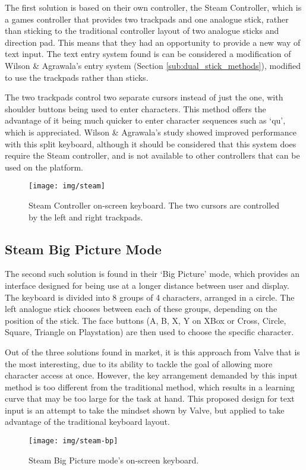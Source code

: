 \documentclass[requirements.tex]{subfiles}
\begin{document}
The first solution is based on their own controller, the Steam Controller, which
is a games controller that provides two trackpads and one analogue stick, rather
than sticking to the traditional controller layout of two analogue sticks and
direction pad. This means that they had an opportunity to provide a new way of
text input. The text entry system found is can be considered a modification of
Wilson \& Agrawala's entry system (Section \ref{sub:dual_stick_methods}),
modified to use the trackpads rather than sticks.

The two trackpads control two separate cursors instead of just the one, with
shoulder buttons being used to enter characters. This method offers the
advantage of it being much quicker to enter character sequences such as `qu',
which is appreciated. Wilson \& Agrawala's study showed improved performance
with this split keyboard, although it should be considered that this system does
require the Steam controller, and is not available to other controllers that can
be used on the platform.

\begin{figure}[H]
	\centering
	\texttt{[image: img/steam]}
	\caption{Steam Controller on-screen keyboard. The two cursors are
	controlled by the left and right trackpads.}
\end{figure}

\subsection{Steam Big Picture Mode} %
\label{sub:steam_big_picture_mode}
The second such solution is found in their `Big Picture' mode, which provides an
interface designed for being use at a longer distance between user and display.
The keyboard is divided into 8 groups of 4 characters, arranged in a circle.
The left analogue stick chooses between each of these groups, depending on the
position of the stick. The face buttons (A, B, X, Y on XBox or Cross, Circle,
Square, Triangle on Playstation) are then used to choose the specific character.

Out of the three solutions found in market, it is this approach from Valve that
is the most interesting, due to its ability to tackle the goal of allowing
more character access at once. However, the key arrangement demanded by this
input method is too different from the traditional method, which results in a
learning curve that may be too large for the task at hand. This proposed design
for text input is an attempt to take the mindset shown by Valve, but applied to
take advantage of the traditional keyboard layout.

\begin{figure}[H]
	\centering
	\texttt{[image: img/steam-bp]}
	\caption{Steam Big Picture mode's on-screen keyboard.}
\end{figure}
\end{document}
